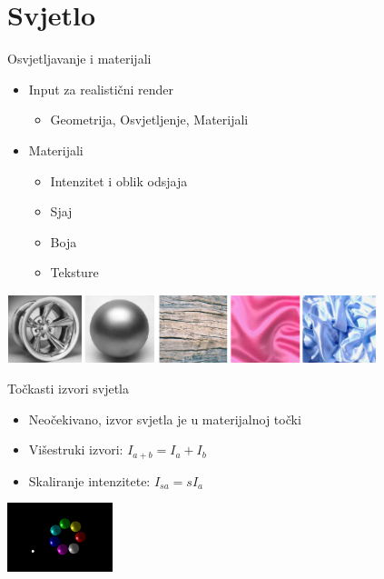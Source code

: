 \documentclass[9pt]{beamer}
\begin{document}
\section{Svjetlo}
\begin{frame}{Osvjetljavanje i materijali}
	\begin{itemize}
		\item<+-> Input za realistični render
		\begin{itemize}
			\item Geometrija, Osvjetljenje, Materijali
		\end{itemize}
		\item<+-> Materijali
		\begin{itemize}
			\item Intenzitet i oblik odsjaja
			\item Sjaj
			\item Boja
			\item Teksture
		\end{itemize}
	\end{itemize}
	\begin{center}
		\includegraphics[height=2cm]{slike/materijali.png}
	\end{center}
\end{frame}

\begin{frame}{Točkasti izvori svjetla}
	\begin{itemize}
		\item Neočekivano, izvor svjetla je u materijalnoj točki
		\item Višestruki izvori: $I_{a+b} = I_{a} + I_{b}$
		\item Skaliranje intenzitete: $I_{sa} = sI_{a} $
	\end{itemize}
	\begin{center}
		\includegraphics[height=2cm]{slike/simple_light.png}
	\end{center}
\end{frame}
\end{document}
